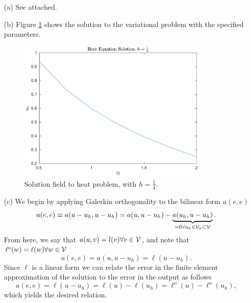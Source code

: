 \documentclass{article}
\begin{document}
\begin{itemize}
	\item[(a)] See attached.
	
	\item[(b)] Figure \ref{soln} shows the solution to the variational problem with the specified parameters. 
	\begin{figure}[t]
		\centering
		\includegraphics[width=0.85\textwidth]{fig2.pdf}
		\caption{Solution field to heat problem, with \(h = \frac{1}{4} \).}
		\label{soln}
	\end{figure}
	
	\item[(c)] We begin by applying Galerkin orthogonality to the bilinear form \(a(e,e)\)
	\begin{equation}
		a(e,e) \equiv a(u-u_h,u-u_h) = a(u,u-u_h) - \underbrace{a(u_h,u-u_h)}_{=0 \forall u_h \in \mathcal{V}_h \subset \mathcal{V}}.
	\end{equation}
	From here, we say that \(a(u,v) = l(v) \forall v \in \mathcal{V} \), and note that \(\ell^\text{o}(w) = \ell(w) \forall w \in \mathcal{V}  \)
	\begin{equation}
		a(e,e) = a(u,u-u_h) = \ell(u-u_h).
	\end{equation}
	Since \(\ell \) is a linear form we can relate the error in the finite element approximation of the solution to the error in the output as follows
	\begin{equation}
		a(e,e) = \ell(u-u_h) = \ell(u) - \ell(u_h) = \ell^\text{o}(u) - \ell^\text{o}(u_h),
	\end{equation}
	which yields the desired relation. 
	

\end{itemize}
\end{document}

